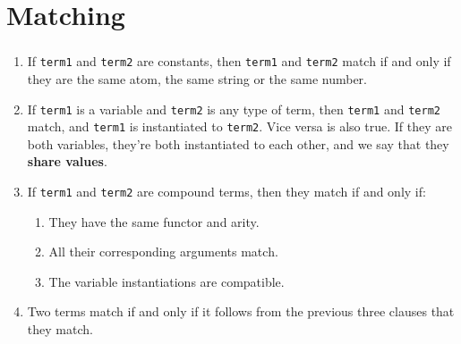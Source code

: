 \section{Matching}


\begin{frame}
	\frametitle{\insertsection}
	\begin{enumerate}
		\item If \texttt{term1} and \texttt{term2} are constants, then \texttt{term1} and \texttt{term2} match if and only if they are the same atom, the same string or the same number.
		\item If \texttt{term1} is a variable and \texttt{term2} is any type of term, then \texttt{term1} and \texttt{term2} match, and \texttt{term1} is instantiated to \texttt{term2}. Vice versa is also true. If they are both variables, they’re both instantiated to each other, and we say that they \textbf{share values}.
		\item If \texttt{term1} and \texttt{term2} are compound terms, then they match if and only if:
		\begin{enumerate}
			\item They have the same functor and arity.
			\item All their corresponding arguments match.
			\item The variable instantiations are compatible.
		\end{enumerate}
		\item Two terms match if and only if it follows from the previous three clauses that they match.
	\end{enumerate}
\end{frame}

